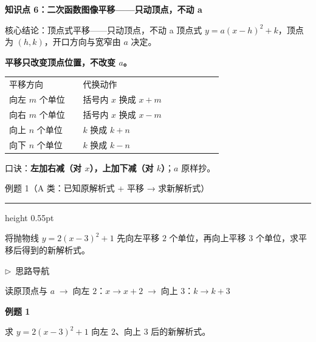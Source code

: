 \documentclass{exam-zh}
\newcommand{\edukai}{\kaishu}
\newcommand{\eduSectionTitle}[1]{%
  \needspace{5\baselineskip}%
  \vspace{2mm}
  {\color{edu-blue}\bfseries\large #1}\par
  \vspace{3mm}
}
\newenvironment{eduSubQuestionItem}[1]{%
  \needspace{4\baselineskip}%
  \vspace{2mm}
  \par\noindent
  \hangindent=8mm\hangafter=1
  {\color{edu-blue}\bfseries #1}\enspace
  \begingroup
  \color{edu-ink}
}{%
  \endgroup
  \par
  \vspace{3mm}
}
\newenvironment{eduAuxItem}[1]{%
  \needspace{4\baselineskip}%
  \vspace{2mm}
  \par\noindent
  \hangindent=8mm\hangafter=1
  {\color{edu-blue}\edukai $\triangleright$~#1}\enspace
  \begingroup
  \color{edu-ink}
  \edukai
}{%
  \endgroup
  \par
  \vspace{4mm}
}
\newenvironment{eduProblemBlock}[1][题目]{%
  \needspace{8\baselineskip}
  {\small\color{edu-muted}#1}\par
  \vspace{1.5mm}
  {\color{edu-blue}\hrule height 0.55pt}
  \vspace{4.5mm}
  \begingroup
  \color{edu-ink}
  \large
  \setlength{\parskip}{2.2mm}
  \linespread{1.20}\selectfont
}{%
  \par
  \endgroup
  \vspace{6mm}
}
\begin{document}
\eduSectionTitle{知识点 6：二次函数图像平移——只动顶点，不动 a}


\begin{eduSolutionBox}{核心结论：顶点式平移——只动顶点，不动 a}
  \begingroup
  \setlength{\parskip}{2.5mm}
顶点式 $y=a(x-h)^2+k$，顶点为 $(h,k)$，开口方向与宽窄由 $a$ 决定。\par
\textbf{平移只改变顶点位置，不改变 $a$。}\par
\begin{tabular}{p{0.30\linewidth}p{0.58\linewidth}}
平移方向 & 代换动作\\
向左 $m$ 个单位 & 括号内 $x$ 换成 $x+m$\\
向右 $m$ 个单位 & 括号内 $x$ 换成 $x-m$\\
向上 $n$ 个单位 & $k$ 换成 $k+n$\\
向下 $n$ 个单位 & $k$ 换成 $k-n$
\end{tabular}
\par
口诀：\textbf{左加右减（对 $x$），上加下减（对 $k$）}；$a$ 原样抄。\par
  \endgroup
\end{eduSolutionBox}




\begin{eduProblemBlock}[例题 1（A 类：已知原解析式 + 平移 → 求新解析式）]
将抛物线 $y=2(x-3)^2+1$ 先向左平移 $2$ 个单位，再向上平移 $3$ 个单位，求平移后得到的新解析式。

\end{eduProblemBlock}





\begin{eduAuxItem}{思路导航}
读原顶点与 $a$$\;\to\;$向左 $2$：$x\to x+2$$\;\to\;$向上 $3$：$k\to k+3$\end{eduAuxItem}




\begin{eduSubQuestionItem}{例题 1}
求 $y=2(x-3)^2+1$ 向左 $2$、向上 $3$ 后的新解析式。\end{eduSubQuestionItem}
\end{document}
